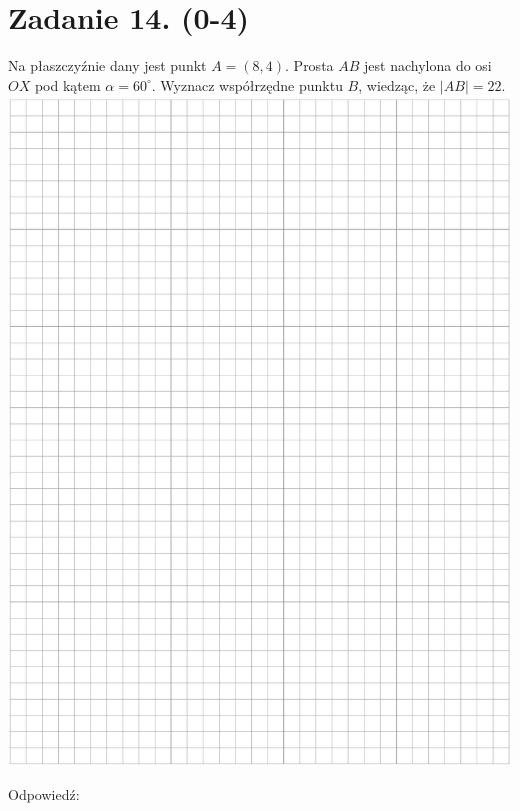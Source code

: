 \documentclass[10pt]{article}
\begin{document}
\section*{Zadanie 14. (0-4)}
Na płaszczyźnie dany jest punkt \(A=(8,4)\). Prosta \(A B\) jest nachylona do osi \(O X\) pod kątem \(\alpha=60^{\circ}\). Wyznacz współrzędne punktu \(B\), wiedząc, że \(|A B|=22\).\\
\includegraphics[max width=\textwidth, center]{2024_11_21_c0ca116654784d42326bg-11}

Odpowiedź:
\end{document}
